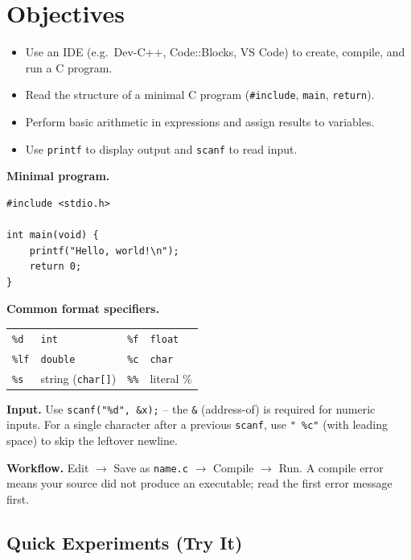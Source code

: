 \documentclass[11pt]{article}
\begin{document}
\labheader

\section*{Objectives}
\begin{itemize}[leftmargin=*,nosep]
  \item Use an IDE (e.g.\ Dev-C++, Code::Blocks, VS Code) to create, compile, and run a C program.
  \item Read the structure of a minimal C program (\texttt{\#include}, \texttt{main}, \texttt{return}).
  \item Perform basic arithmetic in expressions and assign results to variables.
  \item Use \texttt{printf} to display output and \texttt{scanf} to read input.
\end{itemize}

\begin{summary}
\textbf{Minimal program.}
\begin{lstlisting}
#include <stdio.h>

int main(void) {
    printf("Hello, world!\n");
    return 0;
}
\end{lstlisting}

\textbf{Common format specifiers.}\\
\begin{tabular}{@{}llll@{}}
\toprule
\texttt{\%d} & \texttt{int} & \texttt{\%f} & \texttt{float} \\
\texttt{\%lf} & \texttt{double} & \texttt{\%c} & \texttt{char} \\
\texttt{\%s} & string (\texttt{char[]}) & \texttt{\%\%} & literal \% \\
\bottomrule
\end{tabular}

\textbf{Input.} Use \texttt{scanf("\%d", \&x);} -- the \texttt{\&} (address-of) is required for numeric inputs.
For a single character after a previous \texttt{scanf}, use \texttt{" \%c"} (with leading space) to skip the leftover newline.

\textbf{Workflow.} Edit $\rightarrow$ Save as \texttt{name.c} $\rightarrow$ Compile $\rightarrow$ Run.
A compile error means your source did not produce an executable; read the first error message first.
\end{summary}

\subsection*{Quick Experiments (Try It)}
\end{document}
